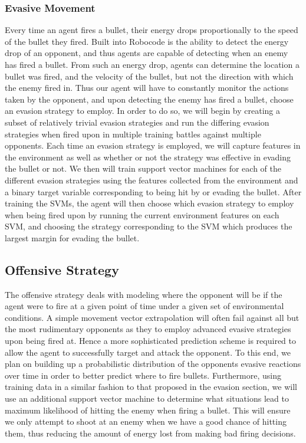 \documentclass{article}
\theoremstyle{plain}
\theoremstyle{definition}
\theoremstyle{remark}
\begin{document}
\subsubsection*{Evasive Movement }
Every time an agent fires a bullet, their energy drops proportionally to the speed of the bullet they fired. Built into Robocode is the ability to detect the energy drop of an opponent, and thus agents are capable of detecting when an enemy has fired a bullet. From such an energy drop, agents can determine the location a bullet was fired, and the velocity of the bullet, but not the direction with which the enemy fired in. Thus our agent will have to constantly monitor the actions taken by the opponent, and upon detecting the enemy has fired a bullet, choose an evasion strategy to employ. In order to do so, we will begin by creating a subset of relatively trivial evasion strategies and run the differing evasion strategies when fired upon in multiple training battles against multiple opponents. Each time an evasion strategy is employed, we will capture features in the environment as well as whether or not the strategy was effective in evading the bullet or not. We then will train support vector machines for each of the different evasion strategies using the features collected from the environment and a binary target variable corresponding to being hit by or evading the bullet. After training the SVMs, the agent will then choose which evasion strategy to employ when being fired upon by running the current environment features on each SVM, and choosing the strategy corresponding to the SVM which produces the largest margin for evading the bullet. 

\subsection*{Offensive Strategy}
The offensive strategy deals with modeling where the opponent will be if the agent were to fire at a given point of time under a given set of environmental conditions. A simple movement vector extrapolation will often fail against all but the most rudimentary opponents as they to employ advanced evasive strategies upon being fired at. Hence a more sophisticated prediction scheme is required to allow the agent to successfully target and attack the opponent. To this end, we plan on building up a probabilistic distribution of the opponents evasive reactions over time in order to better predict where to fire bullets. Furthermore, using training data in a similar fashion to that proposed in the evasion section, we will use an additional support vector machine to determine what situations lead to maximum likelihood of hitting the enemy when firing a bullet. This will ensure we only attempt to shoot at an enemy when we have a good chance of hitting them, thus reducing the amount of energy lost from making bad firing decisions. 
 
\end{document}
